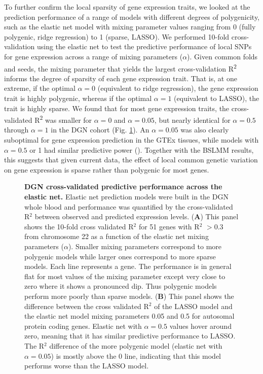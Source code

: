 \documentclass[10pt,letterpaper]{article}
\begin{document}
To further confirm the local sparsity of gene expression traits, we looked at the prediction performance of a range of models with different degrees of polygenicity, such as the elastic net model with mixing parameter values ranging from 0 (fully polygenic, ridge regression) to 1 (sparse, LASSO). We performed 10-fold cross-validation using the elastic net \cite{Zou_2005} to test the predictive performance of local SNPs for gene expression across a range of mixing parameters ($\alpha$). Given common folds and seeds, the mixing parameter that yields the largest cross-validation R\textsuperscript{2} informs the degree of sparsity of each gene expression trait. That is, at one extreme, if the optimal \(\alpha=0\) (equivalent to ridge regression), the gene expression trait is highly polygenic, whereas if the optimal \(\alpha=1\) (equivalent to LASSO), the trait is highly sparse. We found that for most gene expression traits, the cross-validated R\textsuperscript{2} was smaller for \(\alpha=0\) and \(\alpha=0.05\), but nearly identical for \(\alpha=0.5\) through \(\alpha=1\) in the DGN cohort (Fig. \ref{fig-dgn-en}). An \(\alpha=0.05\) was also clearly suboptimal for gene expression prediction in the GTEx tissues, while models with \(\alpha=0.5\) or 1 had similar predictive power (). Together with the BSLMM results, this suggests that given current data, the effect of local common genetic variation on gene expression is sparse rather than polygenic for most genes.

\begin{figure}[H]
\caption{{\bf DGN cross-validated predictive performance across the elastic net.} 
Elastic net prediction models were built in the DGN whole blood and performance was quantified by the cross-validated R$^2$ between observed and predicted expression levels. (\textbf{A}) This panel shows the 10-fold cross validated R$^2$ for 51 genes with R$^2$ $>0.3$ from chromosome 22 as a function of the elastic net mixing parameters (\(\alpha\)). Smaller mixing parameters correspond to more polygenic models while larger ones correspond to more sparse models. Each line represents a gene. The performance is in general flat for most values of the mixing parameter except very close to zero where it shows a pronounced dip. Thus polygenic models perform more poorly than sparse models. (\textbf{B}) This panel shows the difference between the cross validated R$^2$ of the LASSO model and the elastic net model mixing parameters 0.05 and 0.5 for autosomal protein coding genes. Elastic net with $\alpha=0.5$ values hover around zero, meaning that it has similar predictive performance to LASSO. The R$^2$ difference of the more polygenic model (elastic net with $\alpha=0.05$) is mostly above the 0 line, indicating that this model performs worse than the LASSO model.
}
\label{fig-dgn-en}
\end{figure}
\end{document}
